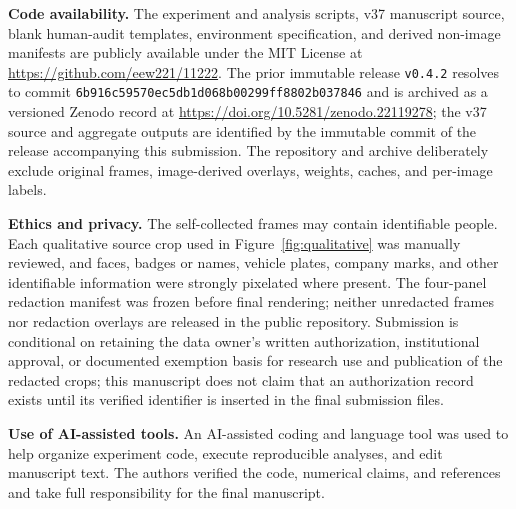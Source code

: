\documentclass[iicol,pdflatex,sn-mathphys-num]{sn-jnl}
\begin{document}
\textbf{Code availability.} The experiment and analysis scripts, v37 manuscript source, blank human-audit templates, environment specification, and derived non-image manifests are publicly available under the MIT License at \url{https://github.com/eew221/11222}. The prior immutable release \texttt{v0.4.2} resolves to commit \texttt{6b916c59570ec5db1d068b00299ff8802b037846} and is archived as a versioned Zenodo record at \url{https://doi.org/10.5281/zenodo.22119278}; the v37 source and aggregate outputs are identified by the immutable commit of the release accompanying this submission. The repository and archive deliberately exclude original frames, image-derived overlays, weights, caches, and per-image labels.

\textbf{Ethics and privacy.} The self-collected frames may contain identifiable people. Each qualitative source crop used in Figure~\ref{fig:qualitative} was manually reviewed, and faces, badges or names, vehicle plates, company marks, and other identifiable information were strongly pixelated where present. The four-panel redaction manifest was frozen before final rendering; neither unredacted frames nor redaction overlays are released in the public repository. Submission is conditional on retaining the data owner's written authorization, institutional approval, or documented exemption basis for research use and publication of the redacted crops; this manuscript does not claim that an authorization record exists until its verified identifier is inserted in the final submission files.

\textbf{Use of AI-assisted tools.} An AI-assisted coding and language tool was used to help organize experiment code, execute reproducible analyses, and edit manuscript text. The authors verified the code, numerical claims, and references and take full responsibility for the final manuscript.


\end{document}
